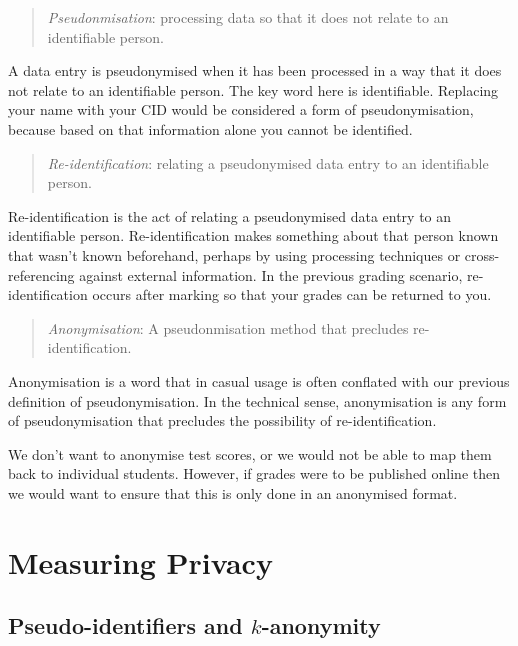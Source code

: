 \documentclass[
  letterpaper,
  DIV=11,
  numbers=noendperiod]{scrreprt}
\begin{document}
\begin{quote}
\emph{Pseudonmisation}: processing data so that it does not relate to an
identifiable person.
\end{quote}

A data entry is pseudonymised when it has been processed in a way that
it does not relate to an identifiable person. The key word here is
identifiable. Replacing your name with your CID would be considered a
form of pseudonymisation, because based on that information alone you
cannot be identified.

\begin{quote}
\emph{Re-identification}: relating a pseudonymised data entry to an
identifiable person.
\end{quote}

Re-identification is the act of relating a pseudonymised data entry to
an identifiable person. Re-identification makes something about that
person known that wasn't known beforehand, perhaps by using processing
techniques or cross-referencing against external information. In the
previous grading scenario, re-identification occurs after marking so
that your grades can be returned to you.

\begin{quote}
\emph{Anonymisation}: A pseudonmisation method that precludes
re-identification.
\end{quote}

Anonymisation is a word that in casual usage is often conflated with our
previous definition of pseudonymisation. In the technical sense,
anonymisation is any form of pseudonymisation that precludes the
possibility of re-identification.

We don't want to anonymise test scores, or we would not be able to map
them back to individual students. However, if grades were to be
published online then we would want to ensure that this is only done in
an anonymised format.

\section{Measuring Privacy}\label{measuring-privacy}

\subsection{\texorpdfstring{Pseudo-identifiers and
\(k\)-anonymity}{Pseudo-identifiers and k-anonymity}}\label{pseudo-identifiers-and-k-anonymity}
\end{document}
